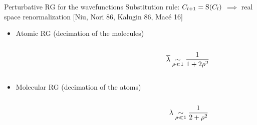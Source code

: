 %	
%	
%	
%	
%	
%	
%

\begin{frame}{Perturbative RG for the wavefunctions}
Substitution rule: $C_{l+1} = \operatorname{S}(C_l)$ $\implies$ real space renormalization [Niu, Nori 86, Kalugin \etal{} 86, Macé \etal{} 16]
	\begin{itemize}

		\item Atomic RG (decimation of the molecules)
			\begin{columns}
			\begin{column}{9cm}
				
			\end{column}
			\begin{column}{2cm}
			\[ \overline{\lambda} \underset{\rho \ll 1}{\sim} \frac{1}{1+2\rho^2}
			\]
			\end{column}
			\end{columns}
		\item Molecular RG (decimation of the atoms)
			\begin{columns}
			\begin{column}{9cm}
				
			\end{column}
			\begin{column}{2cm}
			\[ \lambda \underset{\rho \ll 1}{\sim} \frac{1}{2+\rho^2}
			\]
			\end{column}
			\end{columns}
	\end{itemize}
\end{frame}


